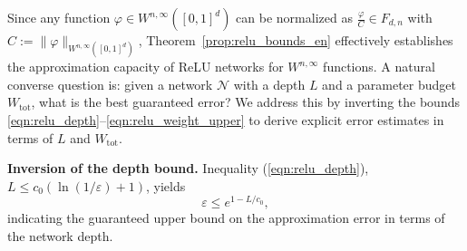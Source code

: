 \documentclass[final,hidelinks,onefignum,onetabnum]{siamart251216}
\begin{document}
Since any function $\varphi\in W^{n,\infty}([0,1]^d)$ can be normalized as $\frac{\varphi}{C} \in F_{d,n}$ with $C := \|\varphi\|_{W^{n,\infty}([0,1]^d)}$,  Theorem~\ref{prop:relu_bounds_en} effectively establishes the approximation capacity of ReLU networks for $W^{n,\infty}$ functions. A natural converse question is: given a network $\mathcal{N}$ with a depth $L$ and a parameter budget $W_{\mathrm{tot}}$, what is the best guaranteed error? We address this by inverting the bounds \eqref{eqn:relu_depth}--\eqref{eqn:relu_weight_upper} to derive explicit error estimates in terms of $L$ and $W_{\mathrm{tot}}$.

\medskip

\noindent\textbf{Inversion of the depth bound.}
Inequality (\ref{eqn:relu_depth}), $L\le c_{0}(\ln(1/\varepsilon)+1)$, yields
\begin{equation}\label{eqn:eps_from_depth}
	\varepsilon \le e^{1 - L/c_{0}},
\end{equation}
indicating the guaranteed upper bound on the approximation error in terms of the network depth.

\medskip
\end{document}
